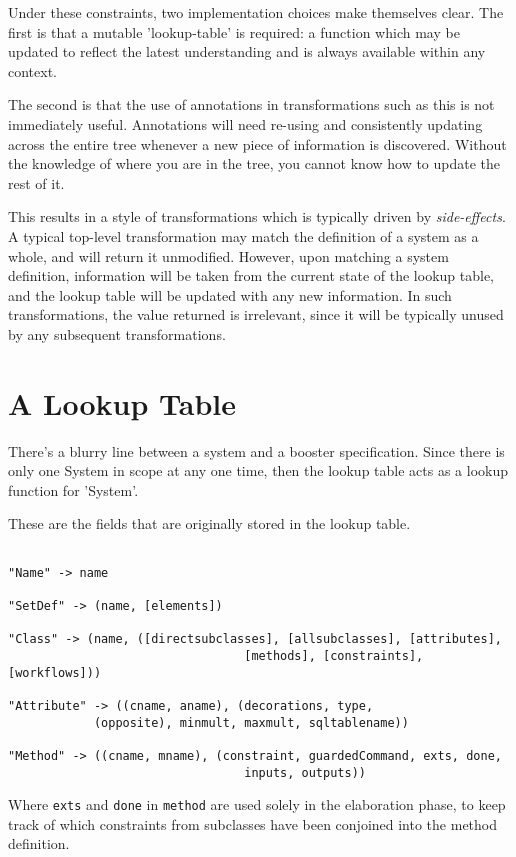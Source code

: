 Under these constraints, two implementation choices make themselves
clear.  The first is that a mutable 'lookup-table' is required: a
function which may be updated to reflect the latest understanding and
is always available within any context.

The second is that the use of annotations in transformations such as
this is not immediately useful.  Annotations will need re-using and
consistently updating across the entire tree whenever a new piece of
information is discovered.  Without the knowledge of where you are in
the tree, you cannot know how to update the rest of it.  

This results in a style of transformations which is typically driven
by \emph{side-effects}.  A typical top-level transformation may match
the definition of a system as a whole, and will return it unmodified.
However, upon matching a system definition, information will be taken
from the current state of the lookup table, and the lookup table will
be updated with any new information.  In such transformations, the
value returned is irrelevant, since it will be typically unused by any
subsequent transformations.




\section{A Lookup Table}

There's a blurry line between a system and a booster specification.
Since there is only one System in scope at any one time, then the
lookup table acts as a lookup function for 'System'.

These are the fields that are originally stored in the lookup table.

\begin{verbatim}

"Name" -> name

"SetDef" -> (name, [elements])

"Class" -> (name, ([directsubclasses], [allsubclasses], [attributes],  
                                 [methods], [constraints], [workflows]))

"Attribute" -> ((cname, aname), (decorations, type, 
            (opposite), minmult, maxmult, sqltablename)) 

"Method" -> ((cname, mname), (constraint, guardedCommand, exts, done, 
                                 inputs, outputs))

\end{verbatim}

Where \verb|exts| and \verb|done| in \verb|method| are used solely in the elaboration
phase, to keep track of which constraints from subclasses have been
conjoined into the method definition.
